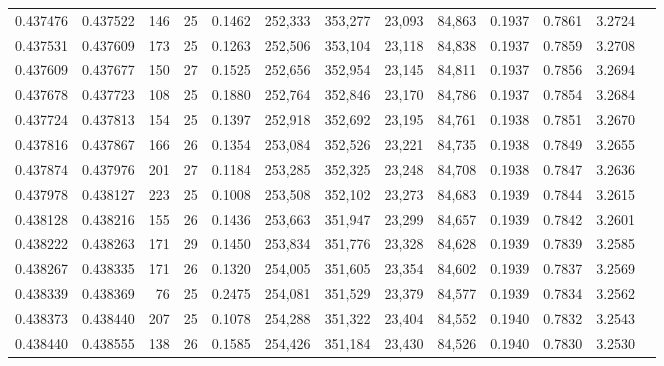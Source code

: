 \begin{tabular}{rrrrrrrrrrrrr}
0.437476 & 0.437522 & 146 &  25 &                                     0.1462 & 252,333 & 353,277 &  23,093 &  84,863 & 0.1937 & 0.7861 & 3.2724 \\
0.437531 & 0.437609 & 173 &  25 &                                     0.1263 & 252,506 & 353,104 &  23,118 &  84,838 & 0.1937 & 0.7859 & 3.2708 \\
0.437609 & 0.437677 & 150 &  27 &                                     0.1525 & 252,656 & 352,954 &  23,145 &  84,811 & 0.1937 & 0.7856 & 3.2694 \\
0.437678 & 0.437723 & 108 &  25 &                                     0.1880 & 252,764 & 352,846 &  23,170 &  84,786 & 0.1937 & 0.7854 & 3.2684 \\
0.437724 & 0.437813 & 154 &  25 &                                     0.1397 & 252,918 & 352,692 &  23,195 &  84,761 & 0.1938 & 0.7851 & 3.2670 \\
0.437816 & 0.437867 & 166 &  26 &                                     0.1354 & 253,084 & 352,526 &  23,221 &  84,735 & 0.1938 & 0.7849 & 3.2655 \\
0.437874 & 0.437976 & 201 &  27 &                                     0.1184 & 253,285 & 352,325 &  23,248 &  84,708 & 0.1938 & 0.7847 & 3.2636 \\
0.437978 & 0.438127 & 223 &  25 &                                     0.1008 & 253,508 & 352,102 &  23,273 &  84,683 & 0.1939 & 0.7844 & 3.2615 \\
0.438128 & 0.438216 & 155 &  26 &                                     0.1436 & 253,663 & 351,947 &  23,299 &  84,657 & 0.1939 & 0.7842 & 3.2601 \\
0.438222 & 0.438263 & 171 &  29 &                                     0.1450 & 253,834 & 351,776 &  23,328 &  84,628 & 0.1939 & 0.7839 & 3.2585 \\
0.438267 & 0.438335 & 171 &  26 &                                     0.1320 & 254,005 & 351,605 &  23,354 &  84,602 & 0.1939 & 0.7837 & 3.2569 \\
0.438339 & 0.438369 &  76 &  25 &                                     0.2475 & 254,081 & 351,529 &  23,379 &  84,577 & 0.1939 & 0.7834 & 3.2562 \\
0.438373 & 0.438440 & 207 &  25 &                                     0.1078 & 254,288 & 351,322 &  23,404 &  84,552 & 0.1940 & 0.7832 & 3.2543 \\
0.438440 & 0.438555 & 138 &  26 &                                     0.1585 & 254,426 & 351,184 &  23,430 &  84,526 & 0.1940 & 0.7830 & 3.2530 \\

\end{tabular}
